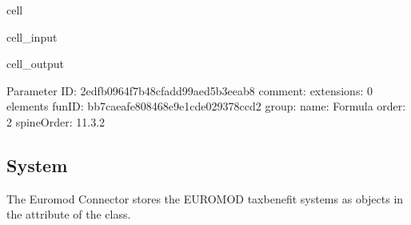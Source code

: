 \documentclass[letterpaper,10pt,english]{sphinxmanual}
\begin{document}
\begin{sphinxuseclass}{cell}
\begin{sphinxuseclass}{cell_input}
\begin{sphinxVerbatim}[commandchars=\\\{\}]
\PYG{p}{[}\PYG{p}{]}\PYG{p}{[}\PYG{p}{]}\PYG{p}{[}\PYG{p}{]}\PYG{p}{[}\PYG{p}{]}
\end{sphinxVerbatim}

\end{sphinxuseclass}
\begin{sphinxuseclass}{cell_output}
\begin{sphinxVerbatim}[commandchars=\\\{\}]
\PYGZhy{}\PYGZhy{}\PYGZhy{}\PYGZhy{}\PYGZhy{}\PYGZhy{}\PYGZhy{}\PYGZhy{}\PYGZhy{}\PYGZhy{}\PYGZhy{}\PYGZhy{}\PYGZhy{}\PYGZhy{}\PYGZhy{}\PYGZhy{}\PYGZhy{}\PYGZhy{}\PYGZhy{}\PYGZhy{}\PYGZhy{}\PYGZhy{}\PYGZhy{}\PYGZhy{}\PYGZhy{}\PYGZhy{}\PYGZhy{}\PYGZhy{}\PYGZhy{}\PYGZhy{}
Parameter
\PYGZhy{}\PYGZhy{}\PYGZhy{}\PYGZhy{}\PYGZhy{}\PYGZhy{}\PYGZhy{}\PYGZhy{}\PYGZhy{}\PYGZhy{}\PYGZhy{}\PYGZhy{}\PYGZhy{}\PYGZhy{}\PYGZhy{}\PYGZhy{}\PYGZhy{}\PYGZhy{}\PYGZhy{}\PYGZhy{}\PYGZhy{}\PYGZhy{}\PYGZhy{}\PYGZhy{}\PYGZhy{}\PYGZhy{}\PYGZhy{}\PYGZhy{}\PYGZhy{}\PYGZhy{}
	 ID: \PYGZsq{}2edfb096\PYGZhy{}4f7b\PYGZhy{}48cf\PYGZhy{}add9\PYGZhy{}9aed5b3eeab8\PYGZsq{}
	 comment: \PYGZsq{}\PYGZsq{}
	 extensions: 0 elements
	 funID: \PYGZsq{}bb7caeaf\PYGZhy{}e808\PYGZhy{}468e\PYGZhy{}9e1c\PYGZhy{}de029378ccd2\PYGZsq{}
	 group: \PYGZsq{}\PYGZsq{}
	 name: \PYGZsq{}Formula\PYGZsq{}
	 order: \PYGZsq{}2\PYGZsq{}
	 spineOrder: \PYGZsq{}11.3.2\PYGZsq{}
\end{sphinxVerbatim}

\end{sphinxuseclass}
\end{sphinxuseclass}

\subsection{System}
\label{\detokenize{notebooks/userguide:system}}
\sphinxAtStartPar
The Euromod Connector stores the EUROMOD tax\sphinxhyphen{}benefit systems as  objects in the attribute  of the  class.
\end{document}
